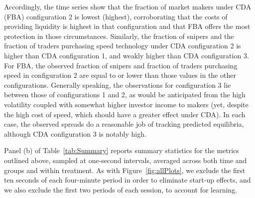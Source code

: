 \documentclass[12pt]{article}
\begin{document}
Accordingly, the time series show that the fraction of market makers under CDA (FBA) configuration 2 is lowest (highest), corroborating that the costs of providing liquidity is highest in that configuration and that FBA offers the most protection in those circumstances. Similarly, the fraction of snipers and the fraction of traders purchasing speed technology under CDA configuration 2 is higher than CDA configuration 1, and weakly higher than CDA configuration 3. For FBA, the observed fraction of snipers and fraction of traders purchasing speed in configuration 2 are equal to or lower than those values in the other configurations. Generally speaking, the observations for configuration 3 lie between those of configurations 1 and 2, as would be anticipated from the high volatility coupled with somewhat higher investor income to makers (yet, despite the high cost of speed, which should have a greater effect under CDA). In each case, the observed spreads do a reasonable job of tracking predicted equilibria, although CDA configuration 3 is notably high.

Panel (b) of Table~\ref{tab:Summary} reports summary statistics for the metrics outlined above, sampled at one-second intervals, averaged across both time and groups and within treatment. As with Figure~\ref{fig:allPlots}, we exclude the first ten seconds of each four-minute period in order to eliminate start-up effects, and we also exclude the first two periods of each session, to account for learning. 
\end{document}
